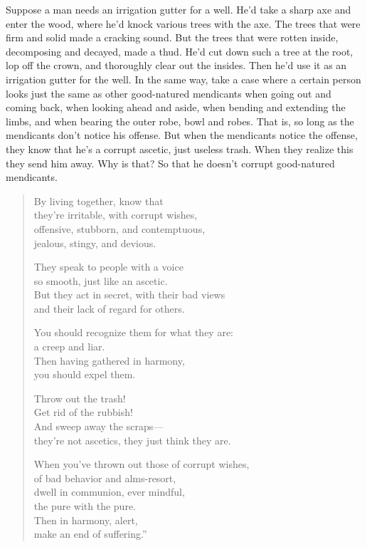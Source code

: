 \documentclass[12pt,openany]{book}%
\begin{document}
Suppose a man needs an irrigation gutter for a well. He’d take a sharp axe and enter the wood, where he’d knock various trees with the axe. The trees that were firm and solid made a cracking sound. But the trees that were rotten inside, decomposing and decayed, made a thud. He’d cut down such a tree at the root, lop off the crown, and thoroughly clear out the insides. Then he’d use it as an irrigation gutter for the well. In the same way, take a case where a certain person looks just the same as other good-natured mendicants when going out and coming back, when looking ahead and aside, when bending and extending the limbs, and when bearing the outer robe, bowl and robes. That is, so long as the mendicants don’t notice his offense. But when the mendicants notice the offense, they know that he’s a corrupt ascetic, just useless trash. When they realize this they send him away. Why is that? So that he doesn’t corrupt good-natured mendicants. 

\begin{verse}%
By living together, know that \\
they’re irritable, with corrupt wishes, \\
offensive, stubborn, and contemptuous, \\
jealous, stingy, and devious. 

They speak to people with a voice \\
so smooth, just like an ascetic. \\
But they act in secret, with their bad views \\
and their lack of regard for others. 

You should recognize them for what they are: \\
a creep and liar. \\
Then having gathered in harmony, \\
you should expel them. 

Throw out the trash! \\
Get rid of the rubbish! \\
And sweep away the scraps—\\
they’re not ascetics, they just think they are. 

When you’ve thrown out those of corrupt wishes, \\
of bad behavior and alms-resort, \\
dwell in communion, ever mindful, \\
the pure with the pure. \\
Then in harmony, alert, \\
make an end of suffering.” 

%
\end{verse}
\end{document}
